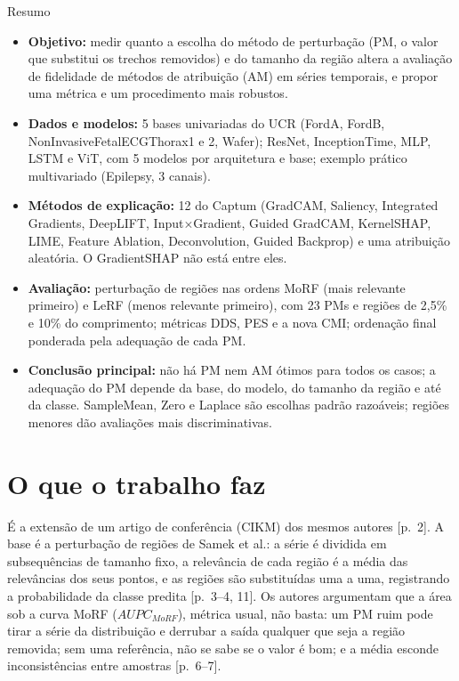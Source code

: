 \documentclass[11pt,a4paper]{article}
\begin{document}
\begin{infobox}[note]{Resumo}
\begin{itemize}
\item \textbf{Objetivo:} medir quanto a escolha do método de perturbação (PM, o valor que substitui os trechos removidos) e do tamanho da região altera a avaliação de fidelidade de métodos de atribuição (AM) em séries temporais, e propor uma métrica e um procedimento mais robustos.
\item \textbf{Dados e modelos:} 5 bases univariadas do UCR (FordA, FordB, NonInvasiveFetalECGThorax1 e 2, Wafer); ResNet, InceptionTime, MLP, LSTM e ViT, com 5 modelos por arquitetura e base; exemplo prático multivariado (Epilepsy, 3 canais).
\item \textbf{Métodos de explicação:} 12 do Captum (GradCAM, Saliency, Integrated Gradients, DeepLIFT, Input$\times$Gradient, Guided GradCAM, KernelSHAP, LIME, Feature Ablation, Deconvolution, Guided Backprop) e uma atribuição aleatória. O GradientSHAP não está entre eles.
\item \textbf{Avaliação:} perturbação de regiões nas ordens MoRF (mais relevante primeiro) e LeRF (menos relevante primeiro), com 23 PMs e regiões de 2,5\% e 10\% do comprimento; métricas DDS, PES e a nova CMI; ordenação final ponderada pela adequação de cada PM.
\item \textbf{Conclusão principal:} não há PM nem AM ótimos para todos os casos; a adequação do PM depende da base, do modelo, do tamanho da região e até da classe. SampleMean, Zero e Laplace são escolhas padrão razoáveis; regiões menores dão avaliações mais discriminativas.
\end{itemize}
\end{infobox}

\section{O que o trabalho faz}
É a extensão de um artigo de conferência (CIKM) dos mesmos autores [p.~2]. A base é a perturbação de regiões de Samek et al.: a série é dividida em subsequências de tamanho fixo, a relevância de cada região é a média das relevâncias dos seus pontos, e as regiões são substituídas uma a uma, registrando a probabilidade da classe predita [p.~3--4, 11]. Os autores argumentam que a área sob a curva MoRF ($AUPC_{MoRF}$), métrica usual, não basta: um PM ruim pode tirar a série da distribuição e derrubar a saída qualquer que seja a região removida; sem uma referência, não se sabe se o valor é bom; e a média esconde inconsistências entre amostras [p.~6--7].
\end{document}
